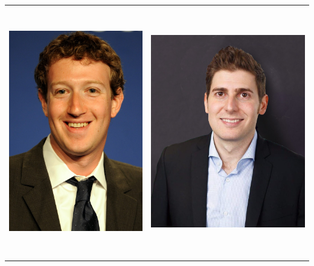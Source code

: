 \documentclass[
]{book}
\begin{document}
\begin{longtable}[]{@{}
  >{\raggedright\arraybackslash}p{}
  >{\raggedright\arraybackslash}p{}@{}}
\toprule\noalign{}
\endhead
\bottomrule\noalign{}
\endlastfoot
\includegraphics[width=3.4375in,height=4.30208in]{images/03-2025-08-19_20/03-mark_zuckenberg.jpg} & \includegraphics[width=3.95833in,height=\textheight]{images/03-2025-08-19_20/04-eduardo_saverin.jpg} \\
\end{longtable}
\end{document}
